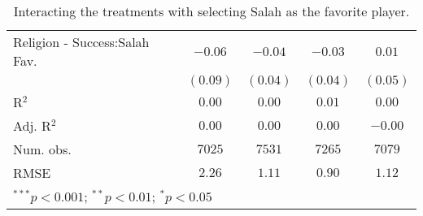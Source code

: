 \begin{table}[H]
\begin{center}
\begin{footnotesize}
\begin{tabular}{l c c c c}
Religion - Success:Salah Fav.  & $-0.06$  & $-0.04$      & $-0.03$      & $0.01$       \\
                               & $(0.09)$ & $(0.04)$     & $(0.04)$     & $(0.05)$     \\
\hline
R$^2$                          & $0.00$   & $0.00$       & $0.01$       & $0.00$       \\
Adj. R$^2$                     & $0.00$   & $0.00$       & $0.00$       & $-0.00$      \\
Num. obs.                      & $7025$   & $7531$       & $7265$       & $7079$       \\
RMSE                           & $2.26$   & $1.11$       & $0.90$       & $1.12$       \\
\hline
\multicolumn{5}{l}{\tiny{$^{***}p<0.001$; $^{**}p<0.01$; $^{*}p<0.05$}}
\end{tabular}
\end{footnotesize}
\caption{Interacting the treatments with selecting Salah as the favorite player.}
\label{tab:ate_salah_fav}
\end{center}
\end{table}
